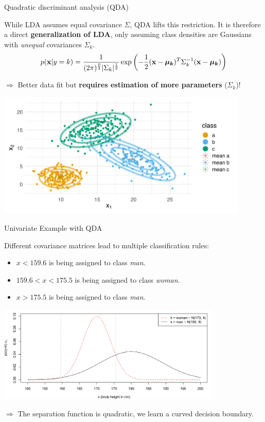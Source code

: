 \documentclass[11pt,compress,t,notes=noshow, xcolor=table]{beamer}
\begin{document}
\begin{vbframe}{Quadratic discriminant analysis (QDA)}

While LDA assumes equal covariance $\Sigma$, QDA lifts this restriction. It is therefore a direct \textbf{generalization of LDA}, only assuming class densities are Gaussians with \textit{unequal} covariances $\Sigma_k$.
$$
p(\mathbf{x} | y= k) = \frac{1}{(2\pi)^{\frac{p}{2}}|\Sigma_k|^{\frac{1}{2}}} \exp\left(-\frac{1}{2}(\mathbf{x} - \bm{\mu_{k}})^T \Sigma_k^{-1} (\mathbf{x} - \bm{\mu_{k}})\right)
$$

$\Rightarrow$ Better data fit but \textbf{requires estimation of more parameters} ($\Sigma_k$)!

\vspace{-0.5em}
\begin{center}
\includegraphics[width=0.9\textwidth, clip=true, trim={0 75 0 45}]{figure/disc_analysis-qda_2.png}
\end{center}

\end{vbframe}

\begin{vbframe}{Univariate Example with QDA}
\begin{small}
Diﬀerent covariance matrices lead to multiple classification rules:
\begin{itemize}
  \item $x < 159.6$ is being assigned to class \textit{man}.
  \item $159.6 < x < 175.5$ is being assigned to class \textit{woman}.
  \item $x > 175.5$ is being assigned to class \textit{man}.
\end{itemize}
\begin{center}
\includegraphics[width=0.8\textwidth, clip=true, trim={0 0 0 0}]{figure/disc_univariate-4.png}
\end{center}
$\Rightarrow$ The separation function is quadratic, we learn a curved decision boundary.
\end{small}
\end{vbframe}
\end{document}
